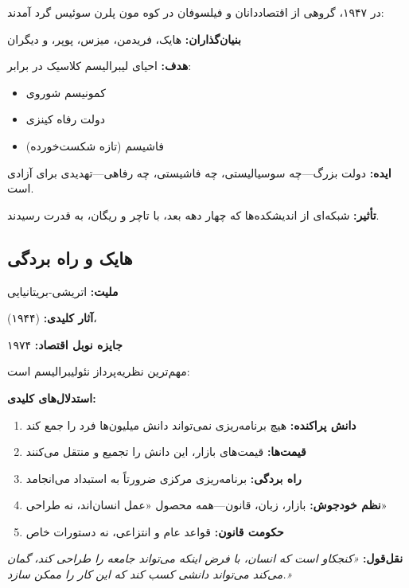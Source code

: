 \begin{historybox}
در ۱۹۴۷، گروهی از اقتصاددانان و فیلسوفان در کوه مون پلرن سوئیس گرد آمدند:

\textbf{بنیان‌گذاران:} هایک، فریدمن، میزس، پوپر، و دیگران

\textbf{هدف:} احیای لیبرالیسم کلاسیک در برابر:
\begin{itemize}[nosep]
    \item کمونیسم شوروی
    \item دولت رفاه کینزی
    \item فاشیسم (تازه شکست‌خورده)
\end{itemize}

\textbf{ایده:} دولت بزرگ—چه سوسیالیستی، چه فاشیستی، چه رفاهی—تهدیدی برای آزادی است.

\textbf{تأثیر:} شبکه‌ای از اندیشکده‌ها که چهار دهه بعد، با تاچر و ریگان، به قدرت رسیدند.
\end{historybox}

\subsection{هایک و راه بردگی}

\begin{personbox}

\textbf{ملیت:} اتریشی-بریتانیایی

\textbf{آثار کلیدی:}  (۱۹۴۴)، 

\textbf{جایزه نوبل اقتصاد:} ۱۹۷۴

\mediumspace

 مهم‌ترین نظریه‌پرداز نئولیبرالیسم است:

\textbf{استدلال‌های کلیدی:}
\begin{enumerate}[nosep]
    \item \textbf{دانش پراکنده:} هیچ برنامه‌ریزی نمی‌تواند دانش میلیون‌ها فرد را جمع کند
    \item \textbf{قیمت‌ها:} قیمت‌های بازار، این دانش را تجمیع و منتقل می‌کنند
    \item \textbf{راه بردگی:} برنامه‌ریزی مرکزی ضرورتاً به استبداد می‌انجامد
    \item \textbf{نظم خودجوش:} بازار، زبان، قانون—همه محصول «عمل انسان‌اند، نه طراحی»
    \item \textbf{حکومت قانون:} قواعد عام و انتزاعی، نه دستورات خاص
\end{enumerate}

\mediumspace

\textbf{نقل‌قول:} \textit{«کنجکاو است که انسان، با فرض اینکه می‌تواند جامعه را طراحی کند، گمان می‌کند می‌تواند دانشی کسب کند که این کار را ممکن سازد.»}
\end{personbox}

